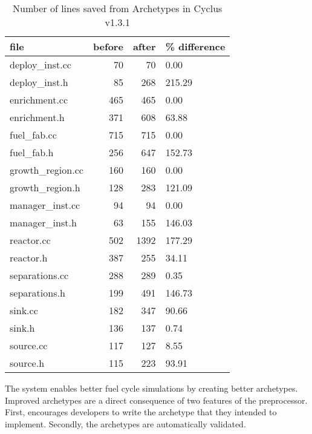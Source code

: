\begin{table}
\caption{ Number of lines saved from Archetypes in Cyclus v1.3.1}
\label{lines}
\begin{tabular}{|lrrl|}
\toprule
file &  before &  after & \% difference \\
\hline
deploy\_inst.cc   &      70 &     70 &         0.00 \\
\hline
deploy\_inst.h    &      85 &    268 &       215.29 \\
\hline
enrichment.cc    &     465 &    465 &         0.00 \\
\hline
enrichment.h     &     371 &    608 &        63.88 \\
\hline
fuel\_fab.cc      &     715 &    715 &         0.00 \\
\hline
fuel\_fab.h       &     256 &    647 &       152.73 \\
\hline
growth\_region.cc &     160 &    160 &         0.00 \\
\hline
growth\_region.h  &     128 &    283 &       121.09 \\
\hline
manager\_inst.cc  &      94 &     94 &         0.00 \\
\hline
manager\_inst.h   &      63 &    155 &       146.03 \\
\hline
reactor.cc       &     502 &   1392 &       177.29 \\
\hline
reactor.h        &     387 &    255 &        34.11 \\
\hline
separations.cc   &     288 &    289 &         0.35 \\
\hline
separations.h    &     199 &    491 &       146.73 \\
\hline
sink.cc          &     182 &    347 &        90.66 \\
\hline
sink.h           &     136 &    137 &         0.74 \\
\hline
source.cc        &     117 &    127 &         8.55 \\
\hline
source.h         &     115 &    223 &        93.91 \\
\bottomrule
\end{tabular}
\end{table}


The \cyclus system enables better fuel cycle simulations by creating better 
archetypes.  Improved archetypes are a direct consequence of two features of the preprocessor. First, 
\cyclus encourages developers to write the archetype
that they intended to implement. Secondly, the archetypes are automatically
validated.


